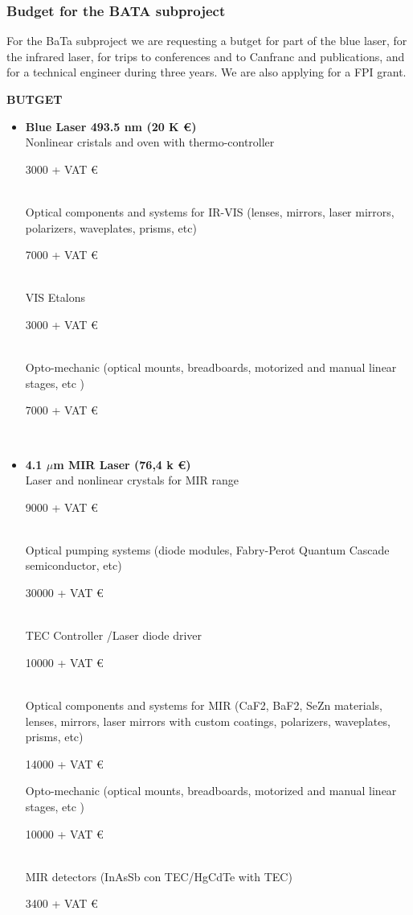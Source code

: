 \subsubsection*{Budget for the BATA subproject}

For the BaTa subproject we are requesting a butget for part of the blue laser, for the infrared laser, for trips to conferences and to Canfranc and publications, and for a technical engineer during three years. We are also applying for a FPI grant.

\textbf{BUTGET}

  \begin{itemize}
  \item \textbf{Blue Laser 493.5  nm  (20 K \euro)}\\
Nonlinear cristals and oven with thermo-controller          {\raggedright 3000 + VAT \euro }\\ 
Optical components and systems for IR-VIS (lenses, mirrors, laser mirrors, polarizers, waveplates, prisms, etc)                      {\raggedright 7000 + VAT \euro} \\
VIS Etalons                                                                                     {\raggedright  3000 + VAT \euro} \\
Opto-mechanic (optical mounts, breadboards, motorized and manual linear stages, etc )                                                       {\raggedright 7000 + VAT \euro} \\

\item \textbf{4.1 $\mu$m MIR Laser (76,4 k \euro)}\\
  Laser and nonlinear crystals for MIR range                        {\raggedright  9000 + VAT \euro} \\
Optical pumping systems (diode modules, Fabry-Perot Quantum Cascade semiconductor, etc)                                                 {\raggedright  30000 + VAT \euro} \\
TEC Controller /Laser diode driver                                   {\raggedright   10000 + VAT \euro} \\
Optical components and systems for MIR (CaF2, BaF2, SeZn materials, lenses, mirrors, laser mirrors with custom coatings, polarizers, waveplates, prisms, etc)                                     {\raggedright 14000 + VAT \euro}
Opto-mechanic (optical mounts, breadboards, motorized and manual linear stages, etc )                                                     {\raggedright   10000 + VAT \euro} \\
MIR detectors (InAsSb con TEC/HgCdTe with TEC)        {\raggedright  3400 + VAT \euro} \\



\end{itemize}
